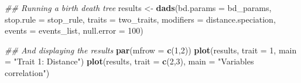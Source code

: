 \documentclass[]{book}
\newenvironment{Shaded}{\begin{snugshade}}{\end{snugshade}}
\newcommand{\CommentTok}[1]{\textcolor[rgb]{0.56,0.35,0.01}{\textit{#1}}}
\newcommand{\DataTypeTok}[1]{\textcolor[rgb]{0.13,0.29,0.53}{#1}}
\newcommand{\DecValTok}[1]{\textcolor[rgb]{0.00,0.00,0.81}{#1}}
\newcommand{\KeywordTok}[1]{\textcolor[rgb]{0.13,0.29,0.53}{\textbf{#1}}}
\newcommand{\NormalTok}[1]{#1}
\newcommand{\StringTok}[1]{\textcolor[rgb]{0.31,0.60,0.02}{#1}}
\begin{document}
\begin{Shaded}
\begin{Highlighting}[]
\CommentTok{## Running a birth death tree }
\NormalTok{results <-}\StringTok{ }\KeywordTok{dads}\NormalTok{(}\DataTypeTok{bd.params  =}\NormalTok{ bd_params,}
                \DataTypeTok{stop.rule  =}\NormalTok{ stop_rule,}
                \DataTypeTok{traits     =}\NormalTok{ two_traits,}
                \DataTypeTok{modifiers  =}\NormalTok{ distance.speciation,}
                \DataTypeTok{events     =}\NormalTok{ events_list,}
                \DataTypeTok{null.error =} \DecValTok{100}\NormalTok{)}

\CommentTok{## And displaying the results}
\KeywordTok{par}\NormalTok{(}\DataTypeTok{mfrow =} \KeywordTok{c}\NormalTok{(}\DecValTok{1}\NormalTok{,}\DecValTok{2}\NormalTok{))}
\KeywordTok{plot}\NormalTok{(results, }\DataTypeTok{trait =} \DecValTok{1}\NormalTok{, }\DataTypeTok{main =} \StringTok{"Trait 1: Distance"}\NormalTok{)}
\KeywordTok{plot}\NormalTok{(results, }\DataTypeTok{trait =} \KeywordTok{c}\NormalTok{(}\DecValTok{2}\NormalTok{,}\DecValTok{3}\NormalTok{), }\DataTypeTok{main =} \StringTok{"Variables correlation"}\NormalTok{)}
\end{Highlighting}
\end{Shaded}


\end{document}

